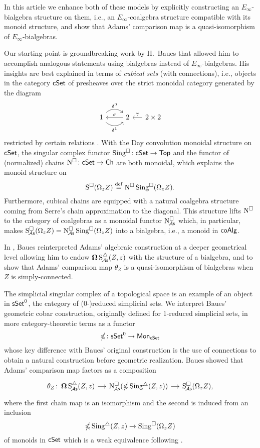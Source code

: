 In this article we enhance both of these models by explicitly constructing an $E_\infty$-bialgebra structure on them, i.e., an $E_\infty$-coalgebra structure compatible with its monoid structure, and show that Adams' comparison map is a quasi-isomorphism of $E_\infty$-bialgebras.

Our starting point is groundbreaking work by H.~Baues that allowed him to accomplish analogous statements using bialgebras instead of $E_\infty$-bialgebras.
His insights are best explained in terms of \textit{cubical sets} (with connections), i.e., objects in the category $\mathsf{cSet}$ of presheaves over the strict monoidal category generated by the diagram
\[
\begin{tikzcd}
1 \arrow[r, out=45, in=135, "\delta^0"] \arrow[r, out=-45, in=-135, "\delta^1"'] & 2 \arrow[l, "\sigma"'] &[-10pt] \arrow[l, "\gamma"'] 2 \times 2
\end{tikzcd}
\]
restricted by certain relations \cite{brown1981cubes}.
With the Day convolution monoidal structure on $\mathsf{cSet}$, the singular complex functor $\operatorname{Sing^{\square}} \colon \mathsf{cSet} \to \mathsf{Top}$ and the functor of (normalized) chains $\operatorname{N^{\square}} \colon \mathsf{cSet} \to \mathsf{Ch}$ are both monoidal, which explains the monoid structure on
\[
\operatorname{S^{\square}}(\Omega_z Z) \stackrel{\mathrm{def}}{=} \operatorname{N^{\square}} \operatorname{Sing^{\square}}(\Omega_z Z).
\]
Furthermore, cubical chains are equipped with a natural coalgebra structure coming from Serre's chain approximation to the diagonal.
This structure lifts $\operatorname{N^{\square}}$ to the category of coalgebras as a monoidal functor $\operatorname{N^{\square}_{\!{\mathcal{A}\mathsf{s}}}}$ which, in particular, makes $\operatorname{S^{\square}_{\!{\mathcal{A}\mathsf{s}}}}(\Omega_z Z)=\operatorname{N^{\square}_{\!{\mathcal{A}\mathsf{s}}}}\operatorname{Sing^{\square}}(\Omega_z Z)$ into a bialgebra, i.e., a monoid in $\mathsf{coAlg}$.

In \cite{baues1998hopf}, Baues reinterpreted Adams' algebraic construction at a deeper geometrical level allowing him to endow $\operatorname{\mathbf{\Omega}} \operatorname{S^{\triangle}_{\!{\mathcal{A}\mathsf{s}}}}(Z,z)$ with the structure of a bialgebra, and to show that Adams' comparison map $\theta_Z$ is a quasi-isomorphism of bialgebras when $Z$ is simply-connected.

The simplicial singular complex of a topological space is an example of an object in $\mathsf{sSet}^0$, the category of ($0$-)reduced simplicial sets.
We interpret Baues' geometric cobar construction, originally defined for $1$-reduced simplicial sets, in more category-theoretic terms as a functor
\begin{equation} \label{e:cubical cobar construction}
\operatorname{\mathbb{\Omega}} \colon \mathsf{sSet}^0 \to \mathsf{Mon}_{\mathsf{cSet}}
\end{equation}
whose key difference with Baues' original construction is the use of connections to obtain a natural construction before geometric realization.
Baues showed that Adams' comparison map factors as a composition
\begin{equation} \label{e:baues factorization of adams map}
\begin{tikzcd}[column sep = small]
\theta_Z \colon \cobar \sSchainsA(Z,z) \arrow[r] &
\cchainsA(\ccobar \sSing(Z,z)) \arrow[r] &
\cSchainsA(\loops_z Z),
\end{tikzcd}
\end{equation}
where the first chain map is an isomorphism and the second is induced from an inclusion
\[
\operatorname{\mathbb{\Omega}} \operatorname{Sing^{\triangle}}(Z,z) \to \operatorname{Sing^{\square}}(\Omega_z Z)
\]
of monoids in $\mathsf{cSet}$ which is a weak equivalence following \cite{rivera2019path}.

